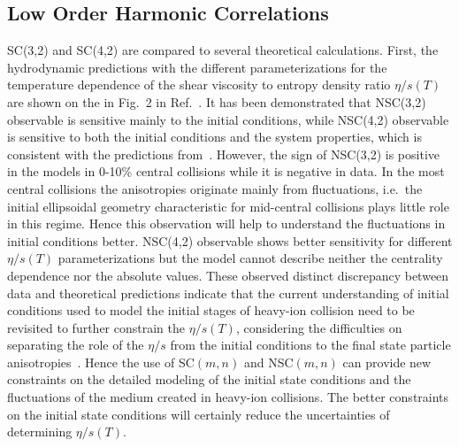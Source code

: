 \subsection{Low Order Harmonic Correlations}
SC(3,2) and SC(4,2) are compared to several theoretical calculations. 
First, the hydrodynamic predictions with the different parameterizations for the temperature dependence of the shear viscosity to entropy density ratio $\eta/s(T)$ are shown on the in Fig.~2 in Ref.~\cite{ALICE:2016kpq}. 
It has been demonstrated that NSC(3,2) observable is sensitive mainly to the initial conditions, while NSC(4,2) observable is sensitive to both the initial conditions and the system properties, which is consistent with the predictions from~\cite{Niemi:2012aj}.
However, the sign of NSC(3,2) is positive in the models in 0-10\% central collisions while it is negative in data.
In the most central collisions the anisotropies originate mainly from fluctuations, i.e.\ the initial ellipsoidal geometry characteristic for mid-central collisions plays little role in this regime. Hence this observation will help to understand the fluctuations in initial conditions better.
NSC(4,2) observable shows better sensitivity for different $\eta/s(T)$ parameterizations but the model cannot describe neither the centrality dependence nor the absolute values. These observed distinct discrepancy between data and theoretical predictions indicate that the current understanding of initial conditions used to model the initial stages of heavy-ion collision need to be revisited to further constrain the $\eta/s(T)$, considering the difficulties on separating the role of the $\eta/s$  from the initial conditions to the final state particle anisotropies~\cite{Romatschke:2007mq,Shen:2011zc}.
Hence the use of SC$(m,n)$ and NSC$(m,n)$ can provide new constraints on the detailed modeling of the initial state conditions and the fluctuations of the medium created in heavy-ion collisions. The better constraints on the initial state conditions will certainly reduce the uncertainties of determining $\eta/s(T)$.

